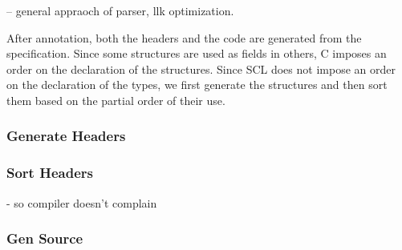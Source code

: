 \documentclass[12pt,oneside,letterpaper]{article}
\begin{document}
-- general appraoch of parser, llk optimization.


After annotation, both the headers and the code are generated from the specification. Since some structures are used as fields  in others, C imposes an order on the declaration of the structures. Since SCL does not impose an order on the declaration of the types, we first generate the structures and then sort them based on the partial order of their use.

\subsubsection{Generate Headers}
\label{sec:GenHeader}

\subsubsection{Sort Headers}
\label{sec:SortHeaders}
- so compiler doesn't complain


\subsubsection{Gen Source}
\label{sec:GenSource}
\end{document}
